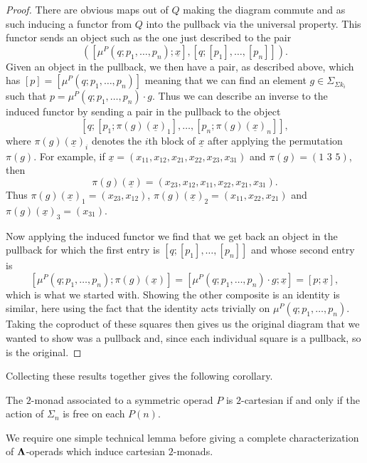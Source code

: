 \begin{proof}
There are obvious maps out of $Q$ making the diagram commute and as such inducing a functor from $Q$ into the pullback via the universal property. This functor sends an object such as the one just described to the pair
    \[
        \left(\left[\mu^P(q;p_1,\ldots,p_n);\underline{x}\right], [q;[p_1],\ldots,[p_n]]\right).
    \]
Given an object in the pullback, we then have a pair, as described above, which has $[p] = [\mu^P(q;p_1,\ldots,p_n)]$ meaning that we can find an element $g \in \Sigma_{\Sigma k_i}$ such that $p  = \mu^P(q;p_1,\ldots,p_n) \cdot g$. Thus we can describe an inverse to the induced functor by sending a pair in the pullback to the object
    \[
        [q;[p_1;\pi(g)(\underline{x})_1],\ldots,[p_n;\pi(g)(\underline{x})_n]],
    \]
where $\pi(g)(\underline{x})_i$ denotes the $i$th block of $\underline{x}$ after applying the permutation $\pi(g)$. For example, if $\underline{x} = (x_{11}, x_{12}, x_{21}, x_{22}, x_{23}, x_{31})$ and $\pi(g) = (1\, \, 3 \, \, 5)$, then
    \[
        \pi(g)(\underline{x}) = (x_{23}, x_{12}, x_{11}, x_{22}, x_{21}, x_{31}).
    \]
Thus $\pi(g)(\underline{x})_1 = (x_{23}, x_{12})$, $\pi(g)(\underline{x})_2 = (x_{11}, x_{22}, x_{21})$ and $\pi(g)(\underline{x})_3 = (x_{31})$.

Now applying the induced functor we find that we get back an object in the pullback for which the first entry is $[q;[p_1],\ldots,[p_n]]$ and whose second entry is
    \[
       \left[\mu^P(q;p_1,\ldots,p_n);\pi(g)(\underline{x})\right] = \left[\mu^P(q;p_1,\ldots,p_n) \cdot g;\underline{x}\right] = [p;\underline{x}],
    \]
which is what we started with. Showing the other composite is an identity is similar, here using the fact that the identity acts trivially on $\mu^P(q;p_1,\ldots,p_n)$. Taking the coproduct of these squares then gives us the original diagram that we wanted to show was a pullback and, since each individual square is a pullback, so is the original.
\end{proof}

Collecting these results together gives the following corollary.

\begin{cor}\label{cart_cor}
The $2$-monad associated to a symmetric operad $P$ is $2$-cartesian if and only if the action of $\Sigma_n$ is free on each $P(n)$.
\end{cor}

We require one simple technical lemma before giving a complete characterization of $\mathbf{\Lambda}$-operads which induce cartesian $2$-monads.

